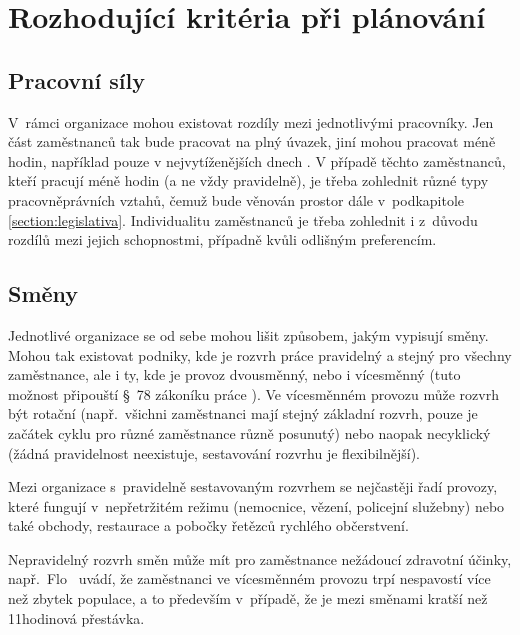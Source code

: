 \documentclass[a4paper,11pt,openany,twoside]{book}
\begin{document}
\section{Rozhodující kritéria při plánování}

\subsection{Pracovní síly}
V~rámci organizace mohou existovat rozdíly mezi jednotlivými pracovníky. Jen část zaměstnanců tak bude pracovat na plný úvazek, jiní mohou pracovat méně hodin, například pouze v nejvytíženějších dnech \cite{lin2015}. V případě těchto zaměstnanců, kteří pracují méně hodin (a ne vždy pravidelně), je třeba zohlednit různé typy pracovněprávních vztahů, čemuž bude věnován prostor dále v~podkapitole \ref{section:legislativa}. Individualitu zaměstnanců je třeba zohlednit i z~důvodu rozdílů mezi jejich schopnostmi, případně kvůli odlišným preferencím.

\subsection{Směny}
\label{sub:smeny}
Jednotlivé organizace se od sebe mohou lišit způsobem, jakým vypisují směny. Mohou tak existovat podniky, kde je rozvrh práce pravidelný a stejný pro všechny zaměstnance, ale i ty, kde je provoz dvousměnný, nebo i vícesměnný (tuto možnost připouští §~78 zákoníku práce \cite{zakonik06-262}). Ve vícesměnném provozu může rozvrh být rotační (např.~všichni zaměstnanci mají stejný základní rozvrh, pouze je začátek cyklu pro různé zaměstnance různě posunutý) nebo naopak necyklický (žádná pravidelnost neexistuje, sestavování rozvrhu je flexibilnější). \cite{musliu2002efficient}



Mezi organizace s~pravidelně sestavovaným rozvrhem se nejčastěji řadí provozy, které fungují v~nepřetržitém režimu (nemocnice, vězení, policejní služebny) nebo také obchody, restaurace a pobočky řetězců rychlého občerstvení. \cite{bechtold1981work}

Nepravidelný rozvrh směn může mít pro zaměstnance nežádoucí zdravotní účinky, např.~Flo~\cite{flo2013shift} uvádí, že zaměstnanci ve vícesměnném provozu trpí nespavostí více než zbytek populace, a to především v~případě, že je mezi směnami kratší než 11hodinová přestávka.
\end{document}
